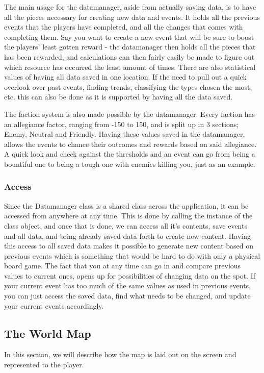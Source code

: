The main usage for the datamanager, aside from actually saving data, is to have all the pieces necessary for creating new data and events. It holds all the previous events that the players have completed, and all the changes that comes with completing them. Say you want to create a new event that will be sure to boost the players' least gotten reward - the datamanager then holds all the pieces that has been rewarded, and calculations can then fairly easily be made to figure out which resource has occurred the least amount of times.
There are also statistical values of having all data saved in one location. If the need to pull out a quick overlook over past events, finding trends, classifying the types chosen the most, etc. this can also be done as it is supported by having all the data saved.

The faction system is also made possible by the datamanager. Every faction has an allegiance factor, ranging from -150 to 150, and is split up in 3 sections; Enemy, Neutral and Friendly. Having these values saved in the datamanager, allows the events to chance their outcomes and rewards based on said allegiance. A quick look and check against the thresholds and an event can go from being a bountiful one to being a tough one with enemies killing you, just as an example.


\subsubsection{Access}
	
Since the Datamanager class is a shared class across the application, it can be accessed from anywhere at any time. This is done by calling the instance of the class object, and once that is done, we can access all it's contents, save events and all data, and bring already saved data forth to create new content. Having this access to all saved data makes it possible to generate new content based on previous events which is something that would be hard to do with only a physical board game. 
The fact that you at any time can go in and compare previous values to current ones, opens up for possibilities of changing data on the spot. If your current event has too much of the same values as used in previous events, you can just access the saved data, find what needs to be changed, and update your current events accordingly.	

\subsection{The World Map}
In this section, we will describe how the map is laid out on the screen and represented to the player.

